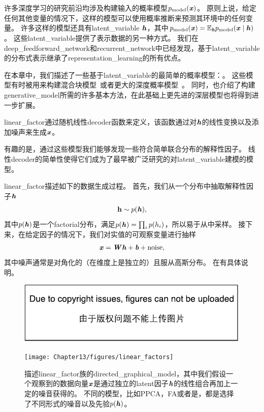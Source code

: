 \chapter{}
\label{chap:linear_factor_models}




许多深度学习的研究前沿均涉及构建输入的概率模型$p_{\text{model}}(\boldsymbol{\mathit{x}})$。
原则上说，给定任何其他变量的情况下，这样的模型可以使用概率推断来预测其环境中的任何变量。
许多这样的模型还具有\gls{latent_variable} $\boldsymbol{\mathit{h}}$，其中$p_{\text{model}}(\boldsymbol{\mathit{x}}) = \mathbb{E}_{\boldsymbol{\mathit{h}}} p_{\text{model}}(\boldsymbol{\mathit{x}}\mid\boldsymbol{\mathit{h}})$。
这些\gls{latent_variable}提供了表示数据的另一种方式。
我们在\gls{deep_feedforward_network}和\gls{recurrent_network}中已经发现，基于\gls{latent_variable}的分布式表示继承了\gls{representation_learning}的所有优点。


在本章中，我们描述了一些基于\gls{latent_variable}的最简单的概率模型：。
这些模型有时被用来构建混合块模型~\citep{Hinton-nips95,ghahramani96em,Roweis+Saul+Hinton-2002}或者更大的深度概率模型~\citep{tang2012deep}。
同时，也介绍了构建\gls{generative_model}所需的许多基本方法，在此基础上更先进的深层模型也将得到进一步扩展。


\gls{linear_factor}通过随机线性\gls{decoder}函数来定义，该函数通过对$\boldsymbol{\mathit{h}}$的线性变换以及添加噪声来生成$\boldsymbol{\mathit{x}}$。


有趣的是，通过这些模型我们能够发现一些符合简单联合分布的解释性因子。
线性\gls{decoder}的简单性使得它们成为了最早被广泛研究的对\gls{latent_variable}建模的模型。


\gls{linear_factor}描述如下的数据生成过程。 
首先，我们从一个分布中抽取解释性因子$\boldsymbol{\mathit{h}}$
\begin{align}
\label{eqn:131}
\mathbf{h} \sim p(\boldsymbol{\mathit{h}}),
\end{align}
其中$p(\boldsymbol{\mathit{h}})$是一个\gls{factorial}分布，满足$p(\boldsymbol{\mathit{h}}) = \prod_{i}^{}p(h_i)$，所以易于从中采样。
接下来，在给定因子的情况下，我们对实值的可观察变量进行抽样
\begin{align}
\label{eqn:132}
\boldsymbol{\mathit{x}} = \boldsymbol{\mathit{W}} \boldsymbol{\mathit{h}} + \boldsymbol{\mathit{b}} + \text{noise},
\end{align}
其中噪声通常是对角化的（在维度上是独立的）且服从高斯分布。
在有具体说明。

\begin{figure}[!htb]
\ifOpenSource
\centerline{\includegraphics{figure.pdf}}
\else
	\centerline{\texttt{[image: Chapter13/figures/linear\_factors]}}
\fi
\caption{描述\gls{linear_factor}族的\gls{directed_graphical_model}，其中我们假设一个观察到的数据向量$\boldsymbol{\mathit{x}}$是通过独立的\gls{latent}因子$\boldsymbol{\mathit{h}}$的线性组合再加上一定的噪音获得的。
不同的模型，比如\gls{PPCA}，\gls{FA}或者是，都是选择了不同形式的噪音以及先验$p(\boldsymbol{\mathit{h}})$。}
\label{fig:linear_factors}
\end{figure}


